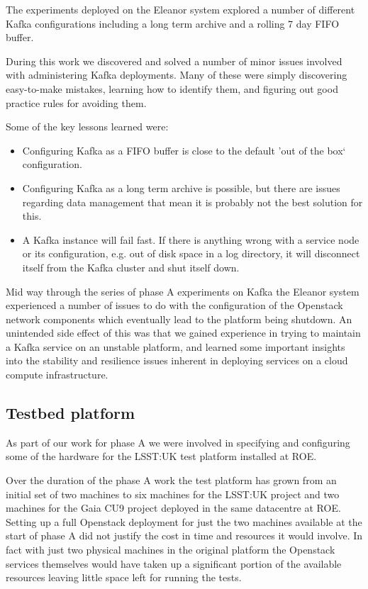 \documentclass{article}
\newcommand{\openstack} {Openstack\xspace}
\newcommand{\datacentre} {datacentre\xspace}
\newcommand{\kafka} {Kafka\xspace}
\newcommand{\fifo} {FIFO\xspace}
\newcommand{\phasea} {phase A\xspace}
\newcommand{\lsstuk} {LSST:UK\xspace}
\newcommand{\gaia} {Gaia\xspace}
\newcommand{\cunine} {CU9\xspace}
\newcommand{\roe} {ROE\xspace}
\newcommand{\testplatform} {test platform\xspace}
\newcommand{\eleanor} {Eleanor\xspace}
\newcommand{\hdisk} {disk\xspace}
\begin{document}
The experiments deployed on the \eleanor system explored a number of different \kafka configurations including a long term archive and a rolling 7 day FIFO buffer.

During this work we discovered and solved a number of minor issues involved with administering \kafka deployments. Many of these were simply discovering easy-to-make mistakes, learning how to identify them, and figuring out good practice rules for avoiding them.

Some of the key lessons learned were:
\begin{itemize}
    \item Configuring \kafka as a \fifo buffer is close to the default 'out of the box` configuration.
    \item Configuring \kafka as a long term archive is possible, but there are issues regarding data management that mean it is probably not the best solution for this. 
    \item A \kafka instance will fail fast. If there is anything wrong with a service node or its configuration, e.g. out of \hdisk space in a log directory, it will disconnect itself from the \kafka cluster and shut itself down.
\end{itemize}

Mid way through the series of \phasea experiments on \kafka the \eleanor system experienced a number of issues to do with the configuration of the \openstack network components which eventually lead to the platform being shutdown.
An unintended side effect of this was that we gained experience in trying to maintain a \kafka service on an unstable platform, and learned some important insights into the stability and resilience issues inherent in deploying services on a cloud compute infrastructure.

\subsection{Testbed platform}
\label{deployment-testbed.platform}

As part of our work for \phasea we were involved in specifying and configuring some of the hardware for the \lsstuk \testplatform installed at \roe.

Over the duration of the \phasea work the \testplatform has grown from an initial set of two machines to six machines for the \lsstuk project and two machines for the \gaia \cunine project deployed in the same \datacentre at \roe. Setting up a full \openstack deployment for just the two machines available at the start of \phasea did not justify the cost in time and resources it would involve. In fact with just two physical machines in the original platform the \openstack services themselves would have taken up a significant portion of the available resources leaving little space left for running the tests.
\end{document}
